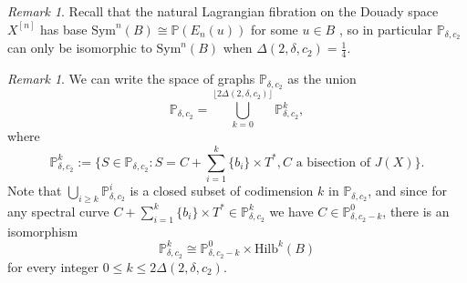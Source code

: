 \documentclass{article}[12pt]
\theoremstyle{definition}
\theoremstyle{remark}
\newtheorem{remark}[theorem]{Remark}
\numberwithin{equation}{section}
\newcommand \mb{\mathbb}
\begin{document}
\begin{remark}
    Recall that the natural Lagrangian fibration on the Douady space $X^{[n]}$ has base $\text{Sym}^n(B)\cong \mb{P}(E_n(u))$ for some $u \in B$ \cite{CatCil}, so in particular $\mb{P}_{\delta,c_2}$ can only be isomorphic to $\text{Sym}^n(B)$ when $\Delta(2,\delta,c_2)=\frac{1}{4}$. 
\end{remark}

\begin{remark}\label{filter}
	We can write the space of graphs $\mb{P}_{\delta,c_2}$ as the union $$\mb{P}_{\delta,c_2}=\bigcup\limits_{k=0}^{\lfloor 2\Delta(2,\delta,c_2)\rfloor} \mb{P}_{\delta,c_2}^k,$$ where $$\mb{P}_{\delta,c_2}^k:=\{S \in \mb{P}_{\delta,c_2}: S=C+\sum\limits_{i=1}^k \{b_i\}\times T^*, C \text{ a bisection of } J(X)\}.$$
	Note that $\bigcup\limits_{i\geq k}\mb{P}_{\delta,c_2}^i$ is a closed subset of codimension $k$ in $\mb{P}_{\delta,c_2}$, and since for any spectral curve $C+\sum\limits_{i=1}^k \{b_i\}\times T^* \in \mb{P}_{\delta,c_2}^k$ we have $C \in \mb{P}_{\delta,c_2-k}^0$, there is an isomorphism $$\mb{P}_{\delta,c_2}^k \cong \mb{P}_{\delta,c_2-k}^0\times \text{Hilb}^k(B)$$
	for every integer $0\leq k \leq 2\Delta(2,\delta,c_2)$.
\end{remark}
\end{document}
